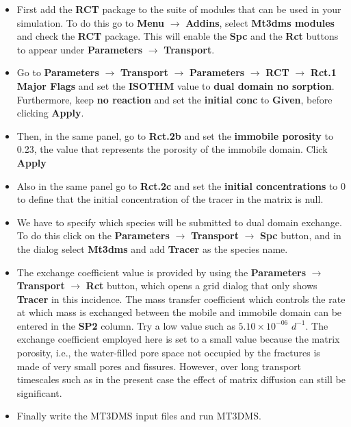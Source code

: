 \begin{itemize}
\item First add the {\color{blue}\textbf{RCT}} package to the suite of 
modules that can be used in your simulation. To do this go to 
{\color{blue}\textbf{Menu}} 
$\rightarrow$ {\color{blue}\textbf{Addins}},
select {\color{blue}\textbf{Mt3dms modules}} 
and check the {\color{blue}\textbf{RCT}} package. 
This will enable the {\color{blue}\textbf{Spc}} 
and the {\color{blue}\textbf{Rct}} buttons
to appear under 
{\color{blue}\textbf{Parameters}} $\rightarrow$ {\color{blue}\textbf{Transport}}.
\item Go to 
{\color{blue}\textbf{Parameters}}
$\rightarrow$ {\color{blue}\textbf{Transport}} 
$\rightarrow$ {\color{blue}\textbf{Parameters}}
$\rightarrow$ {\color{blue}\textbf{RCT}}
$\rightarrow$ {\color{blue}\textbf{Rct.1 Major Flags}}
and set the {\color{blue}\textbf{ISOTHM}} 
value to {\color{blue}\textbf{dual domain no sorption}}. 
Furthermore, keep 
{\color{blue}\textbf{no reaction}} and set the 
{\color{blue}\textbf{initial conc}} to {\color{blue}\textbf{Given}}, 
before clicking {\color{blue}\textbf{Apply}}.
\item Then, in the same panel, go to 
{\color{blue}\textbf{Rct.2b}} and set the {\color{blue}\textbf{immobile porosity}} 
to 0.23, the value that represents the porosity of the immobile domain. 
Click {\color{blue}\textbf{Apply}}
\item Also in the same panel go to {\color{blue}\textbf{Rct.2c}} 
and set the {\color{blue}\textbf{initial concentrations}} to 0 to define that
the initial concentration of the tracer in the matrix is null.
\item We have to specify which species will be submitted 
to dual domain exchange. 
To do this click on the 
{\color{blue}\textbf{Parameters}}
$\rightarrow$ {\color{blue}\textbf{Transport}} 
$\rightarrow$ {\color{blue}\textbf{Spc}}
button, and in the dialog select {\color{blue}\textbf{Mt3dms}} 
and add {\color{blue}\textbf{Tracer}} as the species name.
\item The exchange coefficient value is provided by using the 
{\color{blue}\textbf{Parameters}}
$\rightarrow$ {\color{blue}\textbf{Transport}} 
$\rightarrow$ {\color{blue}\textbf{Rct}}
button, which opens a grid dialog that only shows {\color{blue}\textbf{Tracer}} 
in this incidence. The mass transfer coefficient which controls the
rate at which mass is exchanged between the mobile and immobile
domain can be entered in the {\color{blue}\textbf{SP2}} column. 
Try a low value such as 
$5.10 \times 10^{-06}$ $d^{-1}$. 
The exchange coefficient employed here is set to a small value
because the matrix porosity, i.e., the water-filled pore space 
not occupied by the fractures is made of very small pores and fissures.
However, over long transport timescales such as in the 
present case the effect of matrix diffusion can still be significant.
\item Finally write the MT3DMS input files and run MT3DMS. 
\end{itemize}

